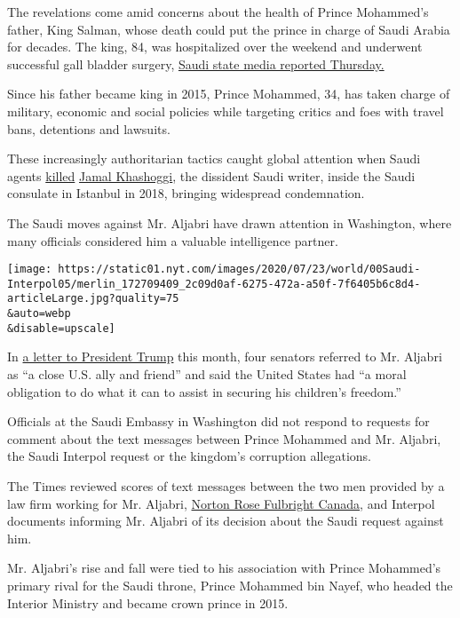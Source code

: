 The revelations come amid concerns about the health of Prince Mohammed's
father, King Salman, whose death could put the prince in charge of Saudi
Arabia for decades. The king, 84, was hospitalized over the weekend and
underwent successful gall bladder surgery,
\href{https://english.alarabiya.net/en/News/gulf/2020/07/23/Saudi-Arabia-s-King-Salman-undergoes-successful-gallbladder-surgery-SPA.html}{Saudi
state media reported Thursday.}

Since his father became king in 2015, Prince Mohammed, 34, has taken
charge of military, economic and social policies while targeting critics
and foes with travel bans, detentions and lawsuits.

These increasingly authoritarian tactics caught global attention when
Saudi agents
\href{https://www.nytimes.com/video/world/middleeast/100000006154117/khashoggi-istanbul-death-saudi-consulate.html}{killed}
\href{https://www.nytimes.com/2018/10/14/world/middleeast/jamal-khashoggi-saudi-arabia.html}{Jamal
Khashoggi}, the dissident Saudi writer, inside the Saudi consulate in
Istanbul in 2018, bringing widespread condemnation.

The Saudi moves against Mr. Aljabri have drawn attention in Washington,
where many officials considered him a valuable intelligence partner.

\texttt{[image: https://static01.nyt.com/images/2020/07/23/world/00Saudi-Interpol05/merlin\_172709409\_2c09d0af-6275-472a-a50f-7f6405b6c8d4-articleLarge.jpg?quality=75\\\&auto=webp\\\&disable=upscale]}

In \href{https://twitter.com/SenatorLeahy/status/1281281725499408386}{a
letter to President Trump} this month, four senators referred to Mr.
Aljabri as ``a close U.S. ally and friend'' and said the United States
had ``a moral obligation to do what it can to assist in securing his
children's freedom.''

Officials at the Saudi Embassy in Washington did not respond to requests
for comment about the text messages between Prince Mohammed and Mr.
Aljabri, the Saudi Interpol request or the kingdom's corruption
allegations.

The Times reviewed scores of text messages between the two men provided
by a law firm working for Mr. Aljabri,
\href{https://www.nortonrosefulbright.com/en-ca}{Norton Rose Fulbright
Canada}, and Interpol documents informing Mr. Aljabri of its decision
about the Saudi request against him.

Mr. Aljabri's rise and fall were tied to his association with Prince
Mohammed's primary rival for the Saudi throne, Prince Mohammed bin
Nayef, who headed the Interior Ministry and became crown prince in 2015.

